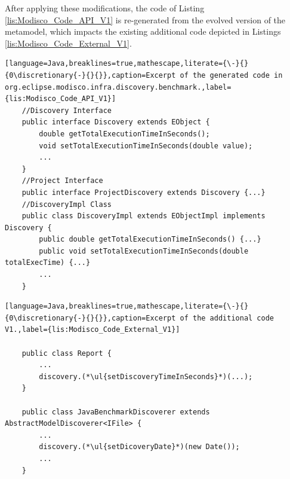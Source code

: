 	



After applying these modifications, the code of Listing \ref{lis:Modisco_Code_API_V1} is re-generated from the evolved version of the metamodel, which impacts the existing additional code depicted in Listings \ref{lis:Modisco_Code_External_V1}. 

\begin{lstlisting}[language=Java,breaklines=true,mathescape,literate={\-}{}{0\discretionary{-}{}{}},caption=Excerpt of the generated code in org.eclipse.modisco.infra.discovery.benchmark.,label={lis:Modisco_Code_API_V1}]
	//Discovery Interface
	public interface Discovery extends EObject {
		double getTotalExecutionTimeInSeconds();
		void setTotalExecutionTimeInSeconds(double value);
		...
	}
	//Project Interface
	public interface ProjectDiscovery extends Discovery {...}
	//DiscoveryImpl Class
	public class DiscoveryImpl extends EObjectImpl implements Discovery {
		public double getTotalExecutionTimeInSeconds() {...}
		public void setTotalExecutionTimeInSeconds(double totalExecTime) {...}
		...
	}
\end{lstlisting}
\begin{lstlisting}[language=Java,breaklines=true,mathescape,literate={\-}{}{0\discretionary{-}{}{}},caption=Excerpt of the additional code V1.,label={lis:Modisco_Code_External_V1}]
	
	public class Report {
		...
		discovery.(*\ul{setDiscoveryTimeInSeconds}*)(...);
	}
	
	public class JavaBenchmarkDiscoverer extends AbstractModelDiscoverer<IFile> {
		...
		discovery.(*\ul{setDicoveryDate}*)(new Date());
		...
	} 
\end{lstlisting}


